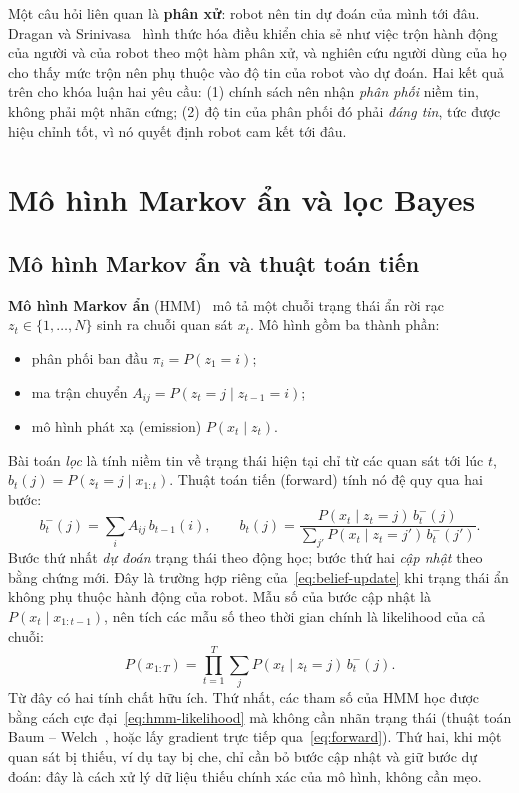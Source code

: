 Một câu hỏi liên quan là \textbf{phân xử}: robot nên tin dự đoán của mình tới đâu. Dragan và Srinivasa~\cite{dragan2013blending} hình thức hóa điều khiển chia sẻ như việc trộn hành động của người và của robot theo một hàm phân xử, và nghiên cứu người dùng của họ cho thấy mức trộn nên phụ thuộc vào độ tin của robot vào dự đoán. Hai kết quả trên cho khóa luận hai yêu cầu: (1) chính sách nên nhận \emph{phân phối} niềm tin, không phải một nhãn cứng; (2) độ tin của phân phối đó phải \emph{đáng tin}, tức được hiệu chỉnh tốt, vì nó quyết định robot cam kết tới đâu.

\section{Mô hình Markov ẩn và lọc Bayes}
\label{sec:bg-hmm}

\subsection{Mô hình Markov ẩn và thuật toán tiến}

\textbf{Mô hình Markov ẩn} (HMM)~\cite{rabiner1989hmm} mô tả một chuỗi trạng thái ẩn rời rạc $z_t\in\{1,\dots,N\}$ sinh ra chuỗi quan sát $x_t$. Mô hình gồm ba thành phần:
\begin{itemize}
  \item phân phối ban đầu $\pi_i=P(z_1=i)$;
  \item ma trận chuyển $A_{ij}=P(z_t=j\mid z_{t-1}=i)$;
  \item mô hình phát xạ (emission) $P(x_t\mid z_t)$.
\end{itemize}
Bài toán \emph{lọc} là tính niềm tin về trạng thái hiện tại chỉ từ các quan sát tới lúc $t$, $b_t(j)=P(z_t=j\mid x_{1:t})$. Thuật toán tiến (forward) tính nó đệ quy qua hai bước:
\begin{equation}
  b^-_t(j)=\sum_i A_{ij}\,b_{t-1}(i),\qquad
  b_t(j)=\frac{P(x_t\mid z_t=j)\,b^-_t(j)}{\sum_{j'}P(x_t\mid z_t=j')\,b^-_t(j')}.
  \label{eq:forward}
\end{equation}
Bước thứ nhất \emph{dự đoán} trạng thái theo động học; bước thứ hai \emph{cập nhật} theo bằng chứng mới. Đây là trường hợp riêng của~\eqref{eq:belief-update} khi trạng thái ẩn không phụ thuộc hành động của robot. Mẫu số của bước cập nhật là $P(x_t\mid x_{1:t-1})$, nên tích các mẫu số theo thời gian chính là likelihood của cả chuỗi:
\begin{equation}
  P(x_{1:T})=\prod_{t=1}^{T}\sum_{j}P(x_t\mid z_t=j)\,b^-_t(j).
  \label{eq:hmm-likelihood}
\end{equation}
Từ đây có hai tính chất hữu ích. Thứ nhất, các tham số của HMM học được bằng cách cực đại~\eqref{eq:hmm-likelihood} mà không cần nhãn trạng thái (thuật toán Baum -- Welch~\cite{rabiner1989hmm}, hoặc lấy gradient trực tiếp qua~\eqref{eq:forward}). Thứ hai, khi một quan sát bị thiếu, ví dụ tay bị che, chỉ cần bỏ bước cập nhật và giữ bước dự đoán: đây là cách xử lý dữ liệu thiếu chính xác của mô hình, không cần mẹo.

